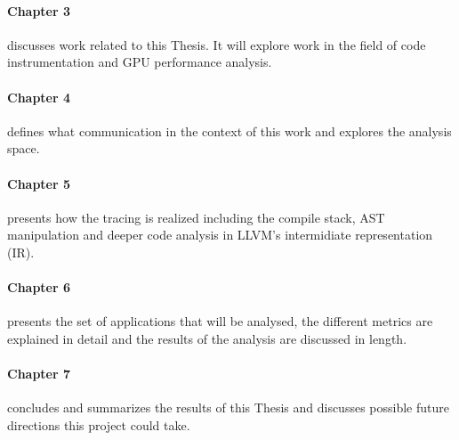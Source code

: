 	\paragraph{Chapter 3} discusses work related to this Thesis. It will explore work in the field of code instrumentation and GPU performance analysis.
	\paragraph{Chapter 4} defines what communication in the context of this work and explores the analysis space.
	\paragraph{Chapter 5} presents how the tracing is realized including the compile stack, AST manipulation and deeper code analysis in LLVM's intermidiate representation (IR).
	\paragraph{Chapter 6} presents the set of applications that will be analysed, the different metrics are explained in detail and the results of the analysis are discussed in length.
	\paragraph{Chapter 7} concludes and summarizes the results of this Thesis and discusses possible future directions this project could take.
